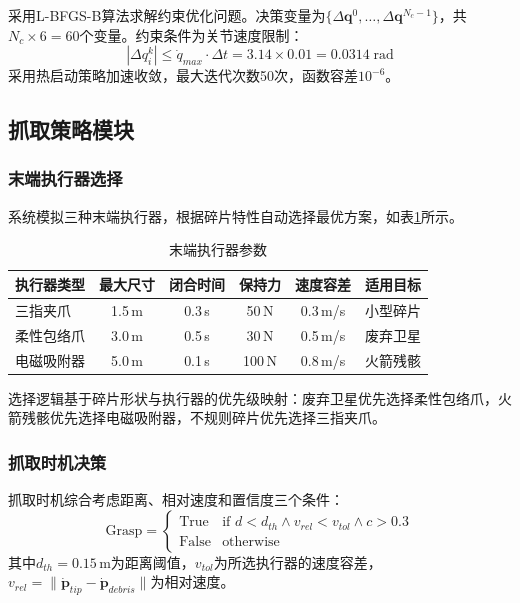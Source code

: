 \documentclass[12pt,a4paper]{ctexart}
\begin{document}
采用L-BFGS-B算法求解约束优化问题。决策变量为$\{\Delta\mathbf{q}^0, \ldots, \Delta\mathbf{q}^{N_c-1}\}$，共$N_c \times 6 = 60$个变量。约束条件为关节速度限制：
\begin{equation}
  |\Delta q_i^k| \leq \dot{q}_{max} \cdot \Delta t = 3.14 \times 0.01 = 0.0314 \;\text{rad}
\end{equation}
采用热启动策略加速收敛，最大迭代次数50次，函数容差$10^{-6}$。


\subsection{抓取策略模块}

\subsubsection{末端执行器选择}

系统模拟三种末端执行器，根据碎片特性自动选择最优方案，如表\ref{tab:gripper}所示。

\begin{table}[H]
\centering
\caption{末端执行器参数}
\label{tab:gripper}
\begin{tabular}{lccccc}
\toprule
执行器类型 & 最大尺寸 & 闭合时间 & 保持力 & 速度容差 & 适用目标 \\
\midrule
三指夹爪     & 1.5\,m & 0.3\,s & 50\,N  & 0.3\,m/s & 小型碎片 \\
柔性包络爪   & 3.0\,m & 0.5\,s & 30\,N  & 0.5\,m/s & 废弃卫星 \\
电磁吸附器   & 5.0\,m & 0.1\,s & 100\,N & 0.8\,m/s & 火箭残骸 \\
\bottomrule
\end{tabular}
\end{table}

选择逻辑基于碎片形状与执行器的优先级映射：废弃卫星优先选择柔性包络爪，火箭残骸优先选择电磁吸附器，不规则碎片优先选择三指夹爪。

\subsubsection{抓取时机决策}

抓取时机综合考虑距离、相对速度和置信度三个条件：
\begin{equation}
  \text{Grasp} = \begin{cases} \text{True} & \text{if } d < d_{th} \wedge v_{rel} < v_{tol} \wedge c > 0.3 \\ \text{False} & \text{otherwise} \end{cases}
\end{equation}
其中$d_{th} = 0.15$\,m为距离阈值，$v_{tol}$为所选执行器的速度容差，$v_{rel} = \|\dot{\mathbf{p}}_{tip} - \dot{\mathbf{p}}_{debris}\|$为相对速度。
\end{document}
